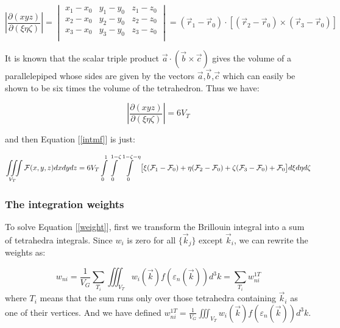 \documentclass[10pt]{article}
\begin{document}
\begin{equation}\label{jacobi2}
\left|\frac{\partial(xyz)}{\partial(\xi\eta\zeta)}\right|=
\begin{vmatrix}
  x_1-x_0 & y_1-y_0 & z_1-z_0 \\
  x_2-x_0 & y_2-y_0 & z_2-z_0 \\
  x_3-x_0 & y_3-y_0 & z_3-z_0 \\
\end{vmatrix}
=(\vec{r}_1-\vec{r}_0)\cdot[(\vec{r}_2-\vec{r}_0)\times(\vec{r}_3-\vec{r}_0)]
\end{equation}

It is known that the scalar triple product $\vec{a}\cdot(\vec{b}\times\vec{c})$ gives the volume of a
parallelepiped whose sides are given by the vectors $\vec{a}$,$\vec{b}$,$\vec{c}$ which can easily be
shown to be six times the volume of the tetrahedron. Thus we have:

\begin{equation}\label{jacobi3}
\left|\frac{\partial(xyz)}{\partial(\xi\eta\zeta)}\right|=6 V_T
\end{equation}

and then Equation [\ref{intmf}] is just:

\begin{equation}\label{intmf2}
\iiint\limits_{V_T}{\mathcal{F}(x,y,z)dxdydz}=6V_T\int\limits_0^1{\int\limits_0^{1-\zeta}{%
\int\limits_0^{1-\zeta-\eta}{\bigl[\xi(\mathcal{F}_1-\mathcal{F}_0)+
\eta(\mathcal{F}_2-\mathcal{F}_0)+\zeta(\mathcal{F}_3-\mathcal{F}_0)+\mathcal{F}_0\bigr] d\xi} d\eta} d\zeta}
\end{equation}

\subsubsection{The integration weights}

To solve Equation [\ref{weight}], first we transform the Brillouin integral into a sum of tetrahedra
integrals. Since $w_i$ is zero for all $\{\vec{k}_j\}$ except $\vec{k}_i$, we can rewrite the weights as:

\begin{equation}\label{wi}
w_{ni}=\frac{1}{V_G}\sum\limits_{T_i}{\iiint_{V_T}{w_i(\vec{k})f(\varepsilon_n(\vec{k}))d^3k}}=
\sum\limits_{T_i}{w_{ni}^{1T}}
\end{equation}
where $T_i$ means that the sum runs only over those tetrahedra containing $\vec{k}_i$ as one of their
vertices. And we have defined
$w_{ni}^{1T}=\tfrac{1}{V_G}\iiint_{V_T}{w_i(\vec{k})f(\varepsilon_n(\vec{k}))d^3k}$.
\end{document}
